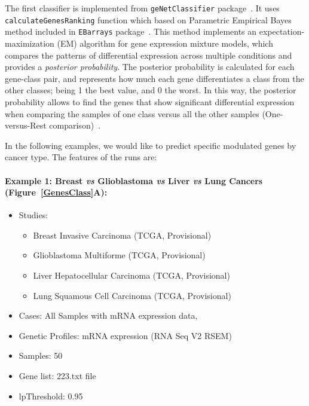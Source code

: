 \documentclass[a4paper]{article}
\begin{document}
The first classifier is implemented from \texttt{geNetClassifier} package~\cite{Aibar2013}. It uses \texttt{calculateGenesRanking} function which based on Parametric Empirical Bayes method included in \texttt{EBarrays} package~\cite{Kendziorski2003}. This method implements an expectation-maximization (EM) algorithm for gene expression mixture models, which compares the patterns of differential expression across multiple conditions and provides a \emph{posterior probability}. The posterior probability is calculated for each gene-class pair, and represents how much each gene differentiates a class from the other classes; being 1 the best value, and 0 the worst. In this way, the posterior probability allows to find the genes that show significant differential expression when comparing the samples of one class versus all the other samples (One-versus-Rest comparison)~\cite{Aibar2013}.

In the following examples, we would like to predict specific modulated genes by cancer type. The features of the runs are:


\paragraph{Example 1: Breast \emph{vs} Glioblastoma \emph{vs} Liver \emph{vs} Lung Cancers (Figure~\ref{GenesClass}A):}

\begin{itemize}
    \item Studies:
     \begin{itemize}
     \item Breast Invasive Carcinoma (TCGA, Provisional)
     \item Glioblastoma Multiforme (TCGA, Provisional)
     \item Liver Hepatocellular Carcinoma (TCGA, Provisional)
     \item Lung Squamous Cell Carcinoma (TCGA, Provisional)
     \end{itemize}
     
    \item Cases: All Samples with mRNA expression data,
    \item Genetic Profiles: mRNA expression (RNA Seq V2 RSEM)
    \item Samples: 50
    \item Gene list: 223.txt file
    \item lpThreshold: 0.95
 \end{itemize}
\end{document}
